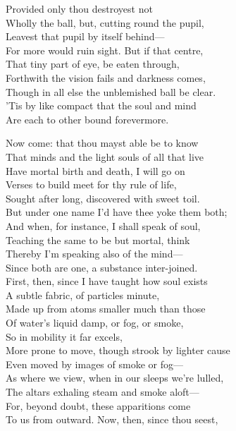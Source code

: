 Provided only thou destroyest not\\
Wholly the ball, but, cutting round the pupil,\\
Leavest that pupil by itself behind—\\
For more would ruin sight. But if that centre,\\
That tiny part of eye, be eaten through,\\
Forthwith the vision fails and darkness comes,\\
Though in all else the unblemished ball be clear.\\
'Tis by like compact that the soul and mind\\
Are each to other bound forevermore.


Now come: that thou mayst able be to know\\
That minds and the light souls of all that live\\
Have mortal birth and death, I will go on\\
Verses to build meet for thy rule of life,\\
Sought after long, discovered with sweet toil.\\
But under one name I'd have thee yoke them both;\\
And when, for instance, I shall speak of soul,\\
Teaching the same to be but mortal, think\\
Thereby I'm speaking also of the mind—\\
Since both are one, a substance inter-joined.\\
First, then, since I have taught how soul exists\\
A subtle fabric, of particles minute,\\
Made up from atoms smaller much than those\\
Of water's liquid damp, or fog, or smoke,\\
So in mobility it far excels,\\
More prone to move, though strook by lighter cause\\
Even moved by images of smoke or fog—\\
As where we view, when in our sleeps we're lulled,\\
The altars exhaling steam and smoke aloft—\\
For, beyond doubt, these apparitions come\\
To us from outward. Now, then, since thou seest,\\
